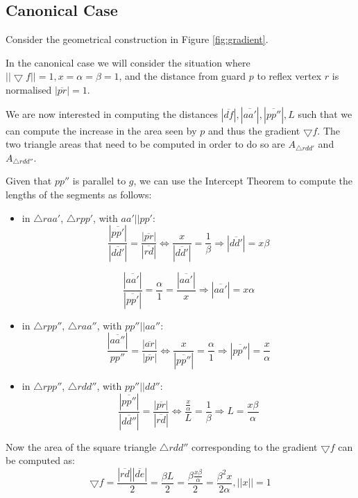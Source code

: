 \subsection{Canonical Case}
Consider the geometrical construction in Figure \ref{fig:gradient}.

In the canonical case we will consider the situation where $||\bigtriangledown f|| = 1, x = \alpha = \beta = 1$, and the distance from guard $p$ to reflex vertex $r$ is normalised $|\overline{pr}| = 1$. 

We are now interested in computing the distances $|\overline{df}|, |\overline{aa'}|, |\overline{pp''}|, L$ such that we can compute the increase in the area seen by $p$ and thus the gradient $\bigtriangledown f$. The two triangle areas that need to be computed in order to do so are $A_{\triangle rdd'}$ and $A_{\triangle rdd''}$.

Given that $pp''$ is parallel to $g$, we can use the Intercept Theorem to compute the lengths of the segments as follows:

\begin{itemize}
    \item in $\triangle raa'$, $\triangle rpp'$, with $aa' || pp'$: $$\frac{|\overline{pp'}|}{|\overline{dd'}|} = \frac{|\overline{pr}|}{|\overline{rd}|} \iff \frac{x}{|\overline{dd'}|} = \frac{1}{\beta} \Rightarrow |\overline{dd'}| = x\beta$$
    
    $$\frac{|\overline{aa'}|}{|\overline{pp'}|} = \frac{\alpha}{1} = \frac{|\overline{aa'}|}{x} \Rightarrow |\overline{aa'}| = x\alpha$$

    \item in $\triangle rpp''$, $\triangle raa''$, with $pp'' || aa''$: $$\frac{|\overline{aa''}|}{pp''} = \frac{|\overline{ar}|}{|\overline{pr}|} \iff \frac{x}{|\overline{pp''}|} = \frac{\alpha}{1} \Rightarrow |\overline{pp''}| = \frac{x}{\alpha}$$
    
    \item in $\triangle rpp''$, $\triangle rdd''$, with $pp'' || dd''$: $$\frac{|\overline{pp''}|}{|\overline{dd''}|} = \frac{|\overline{pr}|}{|\overline{rd}|} \iff \frac{\frac{x}{\alpha}}{L} = \frac{1}{\beta} \Rightarrow L = \frac{x\beta}{\alpha}$$
\end{itemize}

Now the area of the square triangle $\triangle rdd''$ corresponding to the gradient $\bigtriangledown f$ can be computed as: $$\bigtriangledown f = \frac{|\overline{rd}||\overline{de}|}{2} = \frac{\beta L}{2} = \frac{\beta \frac{x\beta}{\alpha}}{2} = \frac{\beta^2x}{2\alpha}, ||x|| = 1$$


